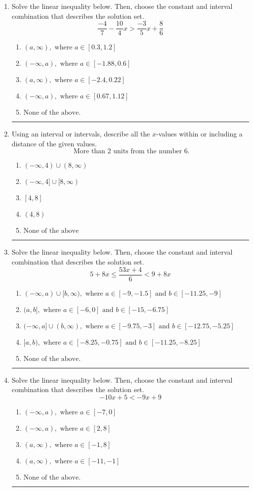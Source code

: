 \documentclass[14pt]{extbook}
\newcommand{\litem}[1]{\item#1\hspace*{-1cm}\rule{\textwidth}{0.4pt}}
\begin{document}
\begin{enumerate}
{\begin{enumerate}[label=\Alph*.]
\end{enumerate} }
\litem{
Solve the linear inequality below. Then, choose the constant and interval combination that describes the solution set.\[ \frac{-4}{7} - \frac{10}{4} x > \frac{-3}{5} x + \frac{8}{6} \]\begin{enumerate}[label=\Alph*.]
\item \( (a, \infty), \text{ where } a \in [0.3, 1.2] \)
\item \( (-\infty, a), \text{ where } a \in [-1.88, 0.6] \)
\item \( (a, \infty), \text{ where } a \in [-2.4, 0.22] \)
\item \( (-\infty, a), \text{ where } a \in [0.67, 1.12] \)
\item \( \text{None of the above}. \)

\end{enumerate} }
\litem{
Using an interval or intervals, describe all the $x$-values within or including a distance of the given values.\[ \text{ More than } 2 \text{ units from the number } 6. \]\begin{enumerate}[label=\Alph*.]
\item \( (-\infty, 4) \cup (8, \infty) \)
\item \( (-\infty, 4] \cup [8, \infty) \)
\item \( [4, 8] \)
\item \( (4, 8) \)
\item \( \text{None of the above} \)

\end{enumerate} }
\litem{
Solve the linear inequality below. Then, choose the constant and interval combination that describes the solution set.\[ 5 + 8 x \leq \frac{53 x + 4}{6} < 9 + 8 x \]\begin{enumerate}[label=\Alph*.]
\item \( (-\infty, a) \cup [b, \infty), \text{ where } a \in [-9, -1.5] \text{ and } b \in [-11.25, -9] \)
\item \( (a, b], \text{ where } a \in [-6, 0] \text{ and } b \in [-15, -6.75] \)
\item \( (-\infty, a] \cup (b, \infty), \text{ where } a \in [-9.75, -3] \text{ and } b \in [-12.75, -5.25] \)
\item \( [a, b), \text{ where } a \in [-8.25, -0.75] \text{ and } b \in [-11.25, -8.25] \)
\item \( \text{None of the above.} \)

\end{enumerate} }
\litem{
Solve the linear inequality below. Then, choose the constant and interval combination that describes the solution set.\[ -10x + 5 < -9x + 9 \]\begin{enumerate}[label=\Alph*.]
\item \( (-\infty, a), \text{ where } a \in [-7, 0] \)
\item \( (-\infty, a), \text{ where } a \in [2, 8] \)
\item \( (a, \infty), \text{ where } a \in [-1, 8] \)
\item \( (a, \infty), \text{ where } a \in [-11, -1] \)
\item \( \text{None of the above}. \)


\end{enumerate}}
\end{enumerate}
\end{document}
